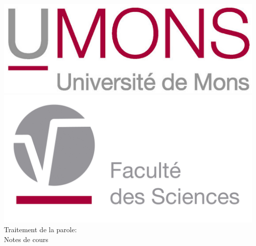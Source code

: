 \documentclass[letterpaper, 12pt]{article}
\begin{document}
\begin{titlepage}

\noindent




\begin{center}
\includegraphics[scale=1.2]{Images/UMONS}\\
\vspace*{0.3cm}
\includegraphics[scale=0.23]{Images/FS_Logo}\\
\vspace*{2.5cm}
\titlefont Traitement de la parole:\\Notes de cours\par
\end{center}
\vspace*{3cm}
\hfill
\begin{minipage}{0.18\linewidth}
  \begin{flushright}

\end{flushright}
\end{minipage}
\end{titlepage}
\end{document}
